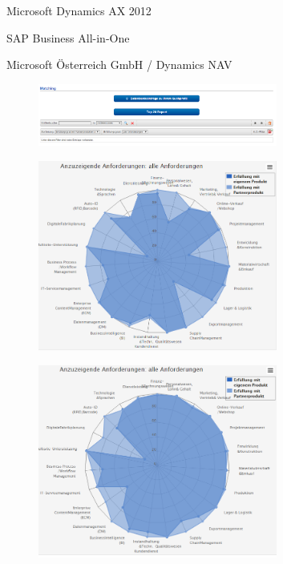 \documentclass[12pt]{article}
\begin{document}
 Microsoft Dynamics AX 2012
 
 SAP Business All-in-One

Microsoft Österreich GmbH / Dynamics NAV



\begin{figure}[here!]
\centering
\includegraphics[width=0.7\textwidth]{images/matching1}
\end{figure}\FloatBarrier
\noindent

\begin{figure}[here!]
\centering
\includegraphics[width=0.7\textwidth]{images/matching2}
\end{figure}\FloatBarrier
\noindent

\begin{figure}[here!]
\centering
\includegraphics[width=0.7\textwidth]{images/matching3}
\end{figure}\FloatBarrier
\noindent
\end{document}
